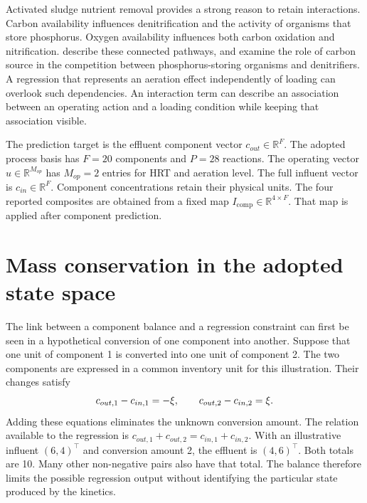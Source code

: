 Activated sludge nutrient removal provides a strong reason to retain interactions. Carbon availability influences denitrification and the activity of organisms that store phosphorus. Oxygen availability influences both carbon oxidation and nitrification. \citet{Wentzel1992} describe these connected pathways, and \citet{Guerrero2011} examine the role of carbon source in the competition between phosphorus-storing organisms and denitrifiers. A regression that represents an aeration effect independently of loading can overlook such dependencies. An interaction term can describe an association between an operating action and a loading condition while keeping that association visible.

The prediction target is the effluent component vector \(c_{out}\in\mathbb{R}^{F}\). The adopted process basis has \(F=20\) components and \(P=28\) reactions. The operating vector \(u\in\mathbb{R}^{M_{op}}\) has \(M_{op}=2\) entries for HRT and aeration level. The full influent vector is \(c_{in}\in\mathbb{R}^{F}\). Component concentrations retain their physical units. The four reported composites are obtained from a fixed map \(I_{\mathrm{comp}}\in\mathbb{R}^{4\times F}\). That map is applied after component prediction.

\section{Mass conservation in the adopted state space}

The link between a component balance and a regression constraint can first be seen in a hypothetical conversion of one component into another. Suppose that one unit of component 1 is converted into one unit of component 2. The two components are expressed in a common inventory unit for this illustration. Their changes satisfy
\begin{equation}
\equationname{Illustrative component changes for a two-component reaction}
\label{eq:icsor_scalar_inventory_example}
c_{out,1}-c_{in,1}=-\xi,
\qquad
c_{out,2}-c_{in,2}=\xi.
\end{equation}
Adding these equations eliminates the unknown conversion amount. The relation available to the regression is \(c_{out,1}+c_{out,2}=c_{in,1}+c_{in,2}\). With an illustrative influent \((6,4)^\top\) and conversion amount 2, the effluent is \((4,6)^\top\). Both totals are 10. Many other non-negative pairs also have that total. The balance therefore limits the possible regression output without identifying the particular state produced by the kinetics.

